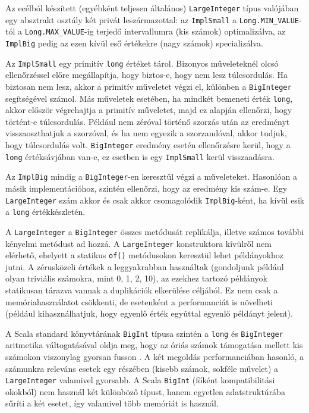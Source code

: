 \documentclass[
    parspace,
    noindent,
    nohyp,
]{elteiktdk}[2023/04/10]
\newcommand{\todoref}[1]{\todo[inline, noinlinepar, color=red, textcolor=white, inlinewidth=0.6cm, caption={#1}]{\large \textbf{×}}}
\begin{document}
Az ecélból készített (egyébként teljesen általános) \texttt{LargeInteger} típus
valójában egy absztrakt osztály két privát leszármazottal:
az \texttt{ImplSmall} a \texttt{Long.MIN\_VALUE}-tól a \texttt{Long.MAX\_VALUE}-ig
terjedő intervallumra (kis számok) optimalizálva,
az \texttt{ImplBig} pedig az ezen kívül eső értékekre (nagy számok) specializálva.

Az \texttt{ImplSmall} egy primitív \texttt{long} értéket tárol.
Bizonyos műveleteknél olcsó ellenőrzéssel előre megállapítja,
hogy biztos-e, hogy nem lesz túlcsordulás.
Ha biztosan nem lesz, akkor a primitív műveletet végzi el,
különben a \texttt{BigInteger} segítségével számol.
Más műveletek esetében, ha mindkét bemeneti érték \texttt{long},
akkor először végrehajtja a primitív műveletet,
majd ez alapján ellenőrzi, hogy történt-e túlcsordulás.
Például nem zéróval történő szorzás után az eredményt visszaoszthatjuk a szorzóval,
és ha nem egyezik a szorzandóval, akkor tudjuk, hogy túlcsordulás volt.
\texttt{BigInteger} eredmény esetén ellenőrzésre kerül,
hogy a \texttt{long} értéksávjában van-e,
ez esetben is egy \texttt{ImplSmall} kerül visszaadásra.

Az \texttt{ImplBig} mindig a \texttt{BigInteger}-en keresztül végzi a műveleteket.
Hasonlóan a másik implementációhoz, szintén ellenőrzi, hogy az eredmény kis szám-e.
Egy \texttt{LargeInteger} szám akkor és csak akkor csomagolódik \texttt{ImplBig}-ként,
ha kívül esik a \texttt{long} értékkészletén.

A \texttt{LargeInteger} a \texttt{BigInteger} összes metódusát replikálja,
illetve számos további kényelmi metódust ad hozzá.
A \texttt{LargeInteger} konstruktora kívülről nem elérhető,
ehelyett a statikus \texttt{of()} metódusokon keresztül lehet példányokhoz jutni.
A zérusközeli értékek a leggyakrabban használtak
(gondoljunk például olyan triviális számokra, mint 0, 1, 2, 10),
az ezekhez tartozó példányok statikusan tárazva vannak a duplikációk elkerülése céljából.
Ez nem csak a memóriahasználatot csökkenti,
de esetenként a performanciát is növelheti
(például kihasználhatjuk, hogy egyenlő érték egyúttal egyenlő példányt jelent).

A Scala standard könyvtárának \texttt{BigInt} típusa szintén a \texttt{long} és \texttt{BigInteger}
aritmetika váltogatásával oldja meg,
hogy az óriás számok támogatása mellett kis számokon viszonylag gyorsan fusson%
\cite{Rosset2019ScalaBigInt}.
A két megoldás performanciában hasonló,
a számunkra releváns esetek egy részében (kisebb számok, sokféle művelet)
a \texttt{LargeInteger} valamivel gyorsabb.
A Scala \texttt{BigInt} (főként kompatibilitási okokból)
nem használ két különböző típust,
hanem egyetlen adatstruktúrába sűríti a két esetet,
így valamivel több memóriát is használ.
\todoref{+MÉRÉS: LargeInteger és BigInt: több mérés, memória is, optimalizáció}
\end{document}
